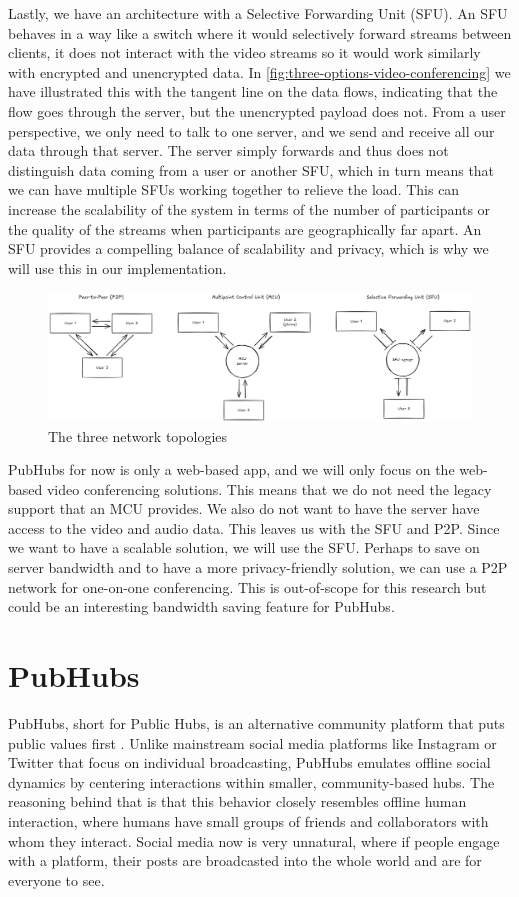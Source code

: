 \documentclass{report}
\begin{document}
Lastly, we have an architecture with a Selective Forwarding Unit (SFU). An SFU behaves in a way like a switch where it
would selectively forward streams between clients, it does not interact with the video streams so it would work
similarly with encrypted and unencrypted data.  In \autoref{fig:three-options-video-conferencing} we have
illustrated this with the tangent line on the data flows, indicating that the flow goes through the server, but
the unencrypted payload does not. From a user perspective, we only need to talk to one server, and we
send and receive all our data through that server.  The server simply forwards and thus does not distinguish data
coming from a user or another SFU, which in turn means that we can have multiple SFUs working together to relieve
the load. This can increase the scalability of the system in terms of the number of participants or the quality of the streams when
participants are geographically far apart. An SFU provides a compelling balance of scalability and privacy, which is
why we will use this in our implementation.

\begin{figure}[!hbt]
\centering
\includegraphics[width=\textwidth]{img/thesisDPD}
\caption{The three network topologies}
\label{fig:three-options-video-conferencing}
\end{figure}

PubHubs for now is only a web-based app, and we will only focus on the web-based video conferencing solutions. This means
that we do not need the legacy support that an MCU provides. We also do not want to have the server have access to the
video and audio data. This leaves us with the SFU and P2P. Since we want to have a scalable solution, we will use
the SFU.
Perhaps to save on server bandwidth and to have a more privacy-friendly solution, we can use a P2P network for one-on-one
conferencing. This is out-of-scope for this research but could be an interesting bandwidth saving feature for PubHubs.

\section{PubHubs}\label{sec:pubhubs}
PubHubs, short for Public Hubs, is an alternative community platform that puts public values first
\cite{jacobs_pubhubs_2023}. Unlike mainstream social media platforms like Instagram or Twitter that focus on
individual broadcasting, PubHubs emulates offline social dynamics by centering interactions within smaller,
community-based hubs. The reasoning
behind that is that this behavior closely resembles offline human interaction, where humans have small groups of
friends and collaborators with whom they interact. Social media now is very unnatural, where if people engage with a
platform, their posts are broadcasted into the whole world and are for everyone to see.
\end{document}

